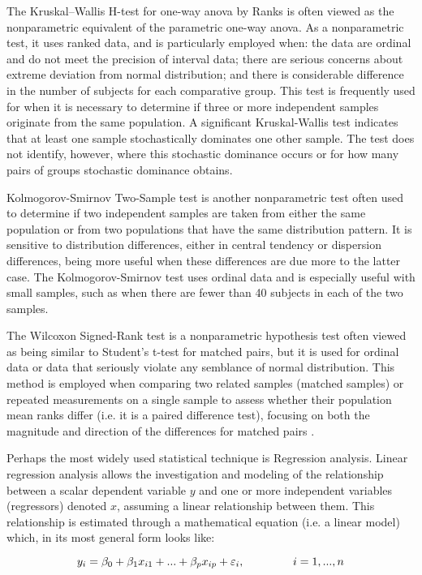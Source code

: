 The Kruskal–Wallis H-test for one-way \gls{anova} by Ranks is often viewed as the nonparametric equivalent of the parametric one-way \gls{anova}. As a nonparametric test, it uses ranked data, and is particularly employed when: the data are ordinal and do not meet the precision of interval data; there are serious concerns about extreme deviation from normal distribution; and there is considerable difference in the number of subjects for each comparative group. This test is frequently used for when it is necessary to determine if three or more independent samples originate from the same population. A significant Kruskal-Wallis test indicates that at least one sample stochastically dominates one other sample. The test does not identify, however, where this stochastic dominance occurs or for how many pairs of groups stochastic dominance obtains.

Kolmogorov-Smirnov Two-Sample test is another nonparametric test often used to determine if two independent samples are taken from either the same population or from two populations that have the same distribution pattern. It is sensitive to distribution differences, either in central tendency or dispersion differences, being more useful when these differences are due more to the latter case. The Kolmogorov-Smirnov test uses ordinal data and is especially useful with small samples, such as when there are fewer than 40 subjects in each of the two samples.

The Wilcoxon Signed-Rank test is a nonparametric hypothesis test often viewed as being similar to Student's t-test for matched pairs, but it is used for ordinal data or data that seriously violate any semblance of normal distribution. This method is employed when comparing two related samples (matched samples) or repeated measurements on a single sample to assess whether their population mean ranks differ (i.e. it is a paired difference test), focusing on both the magnitude and direction of the differences for matched pairs \citep{macfarland2016introduction}.

Perhaps the most widely used statistical technique is Regression analysis. Linear regression analysis allows the investigation and modeling of the relationship between a scalar dependent variable $ y $ and one or more independent variables (regressors) denoted $ x $, assuming a linear relationship between them. This relationship is estimated through a mathematical equation (i.e. a linear model) which, in its most general form looks like:

\begin{equation}
	\centering
	\label{regression}
		y_{i} = \beta_{0} + \beta_{1}x_{i1} + ... + \beta_{p}x_{ip} + \varepsilon_{i},	\hspace{15mm}	i = 1,...,n
\end{equation}
 
